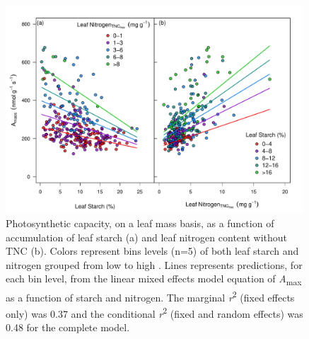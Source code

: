 \documentclass[a4paper]{article}\usepackage[]{graphicx}\usepackage[]{color}
\begin{document}
\begin{figure}[h!]
    \centering
    \includegraphics[width=0.99\textwidth]{A_leafchem.pdf}
    \caption{Photosynthetic capacity, on a leaf mass basis, as a function of accumulation of leaf starch (a) and leaf nitrogen content without TNC (b).  Colors represent bins levels (n=5) of both leaf starch and nitrogen grouped from low to high .  Lines represents predictions, for each bin level, from the linear mixed effects model equation of \textit{A}\textsubscript{max} as a function of starch and nitrogen. The marginal \textit{r}\textsuperscript{2} (fixed effects only) was 0.37 and the conditional \textit{r}\textsuperscript{2} (fixed and random effects) was 0.48 for the complete model.}
    \label{fig:figure5}
\end{figure}
\end{document}
